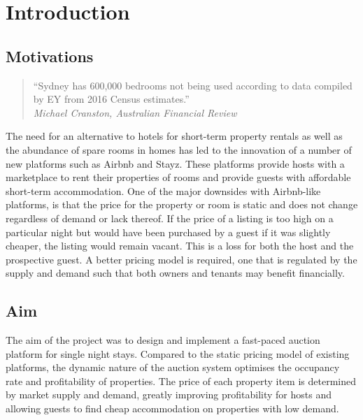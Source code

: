 \section{Introduction}

\subsection{Motivations}

\smallskip
\begin{quote}
  ``Sydney has 600,000 bedrooms not being used according to data
  compiled by EY from 2016 Census estimates.'' \\
  \hspace*{\fill}\emph{Michael Cranston, Australian Financial Review}
\end{quote}

The need for an alternative to hotels for short-term property rentals as well
as the abundance of spare rooms in homes has led to the innovation of
a number of new platforms such as Airbnb and Stayz.
These platforms provide hosts with a marketplace to rent their properties of rooms and
provide guests with affordable short-term accommodation. One of the major downsides
with Airbnb-like platforms, is that
the price for the property or room is static and does not change regardless
of demand or lack thereof. If the price of a listing is too high on a particular night
but would have been purchased by a guest if it was slightly cheaper, the listing would
remain vacant. This is a loss for both the host and the prospective guest. A better
pricing model is required, one that is regulated by the supply and demand such that
both owners and tenants may benefit financially.

\subsection{Aim}
The aim of the project was to design and implement a fast-paced auction
platform for single night stays. Compared to the static pricing
model of existing platforms, the dynamic nature of the auction system
optimises the occupancy rate and profitability of properties.
The price of each property item is determined
by market supply and demand, greatly improving profitability for hosts and
allowing guests to find cheap accommodation on properties with low demand.

